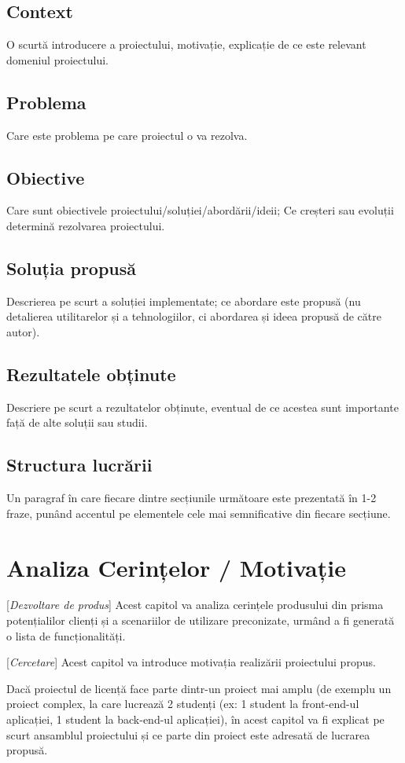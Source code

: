 \documentclass[12pt,a4paper]{report}
\newcommand{\worktype}[1]{[\textit{#1}] }
\newcommand{\dezvoltare}{\worktype{Dezvoltare de produs}}
\newcommand{\cercetare}{\worktype{Cercetare}}
\begin{document}
\section{Context}
O scurtă introducere a proiectului, motivație, explicație de ce este relevant domeniul proiectului.
\section{Problema}
Care este problema pe care proiectul o va rezolva.
\section{Obiective}
Care sunt obiectivele proiectului/soluției/abordării/ideii; Ce creșteri sau evoluții determină rezolvarea proiectului.
\section{Soluția propusă}
Descrierea pe scurt a soluției implementate; ce abordare este propusă (nu detalierea utilitarelor și a tehnologiilor, ci abordarea și ideea propusă de către autor).
\section{Rezultatele obținute}
Descriere pe scurt a rezultatelor obținute, eventual de ce acestea sunt importante față de alte soluții sau studii.
\section{Structura lucrării}
Un paragraf în care fiecare dintre secțiunile următoare este prezentată în 1-2 fraze, punând accentul pe elementele cele mai semnificative din fiecare secțiune.



\chapter{Analiza Cerințelor / Motivație}
\dezvoltare Acest capitol va analiza cerințele produsului din prisma potențialilor clienți și a scenariilor de utilizare preconizate, urmând a fi generată o lista de funcționalități.

\cercetare Acest capitol va introduce motivația realizării proiectului propus.

Dacă proiectul de licență face parte dintr-un proiect mai amplu (de exemplu un proiect complex, la care lucrează 2 studenți (ex: 1 student la front-end-ul aplicației, 1 student la back-end-ul aplicației), în acest capitol va fi explicat pe scurt ansamblul proiectului și ce parte din proiect este adresată de lucrarea propusă.
\end{document}
